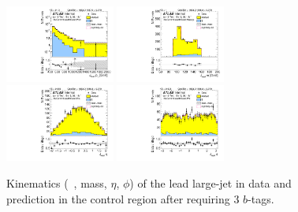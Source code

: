 \clearpage

\begin{figure}[htbp!]
\begin{center}
\includegraphics[width=0.32\textwidth,angle=-90]{figures/boosted/Control/b77_ThreeTag_Control_leadHCand_Pt_m_1.pdf}
\includegraphics[width=0.32\textwidth,angle=-90]{figures/boosted/Control/b77_ThreeTag_Control_leadHCand_Mass_s.pdf}\\
\includegraphics[width=0.32\textwidth,angle=-90]{figures/boosted/Control/b77_ThreeTag_Control_leadHCand_Eta.pdf}
\includegraphics[width=0.32\textwidth,angle=-90]{figures/boosted/Control/b77_ThreeTag_Control_leadHCand_Phi.pdf}
  \caption{Kinematics (\pt~, mass, $\eta$, $\phi$) of the lead large-\R jet in data and prediction in the control region after requiring 3 $b$-tags. }
  \label{fig:boosted-3b-control-ak10-lead}
\end{center}
\end{figure}

